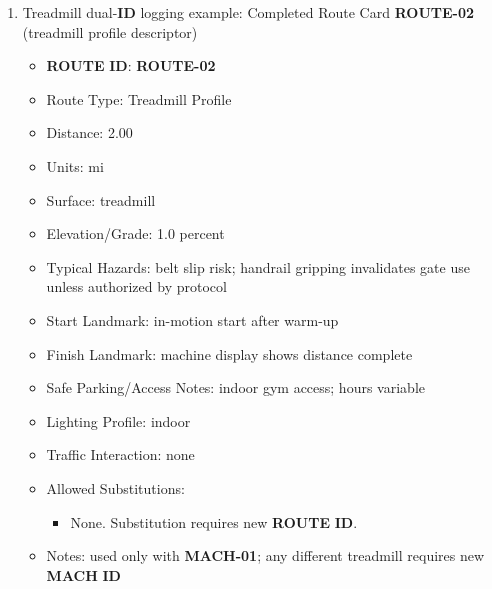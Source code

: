 \documentclass[10pt]{article}
\begin{document}
\begin{landscape}
\begin{enumerate}
\begin{itemize}
\item \textbf{MACH} \textbf{ID}: \textbf{MACH-01}
\item Type: Treadmill
\item Make/Model: \textbf{UNKNOWN}
\item Location: apartment complex gym
\item Calibration/Consistency Notes: machine display distance used; no external calibration available
\item Required Settings Fields:
\begin{itemize}
\item Speed: variable by test protocol
\item Speed Units: mph
\item Incline/Grade Percent: 1.0
\item Resistance Level/Scale: N/A
\end{itemize}
\item Notes: record any pauses as an invalidation cause for gate use unless the protocol explicitly allows them
\end{itemize}

\item Treadmill dual-\textbf{ID} logging example: Completed Route Card \textbf{ROUTE-02} (treadmill profile descriptor)

\begin{itemize}
\item \textbf{ROUTE} \textbf{ID}: \textbf{ROUTE-02}
\item Route Type: Treadmill Profile
\item Distance: 2.00
\item Units: mi
\item Surface: treadmill
\item Elevation/Grade: 1.0 percent
\item Typical Hazards: belt slip risk; handrail gripping invalidates gate use unless authorized by protocol
\item Start Landmark: in-motion start after warm-up
\item Finish Landmark: machine display shows distance complete
\item Safe Parking/Access Notes: indoor gym access; hours variable
\item Lighting Profile: indoor
\item Traffic Interaction: none
\item Allowed Substitutions:
\begin{itemize}
\item None. Substitution requires new \textbf{ROUTE} \textbf{ID}.
\end{itemize}
\item Notes: used only with \textbf{MACH-01}; any different treadmill requires new \textbf{MACH} \textbf{ID}
\end{itemize}


\end{enumerate}
\end{landscape}
\end{document}
